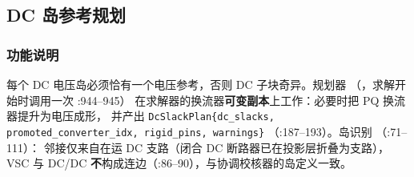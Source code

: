 \subsection{DC 岛参考规划}\label{sec:hybrid-dcref}

\subsubsection*{功能说明}
每个 DC 电压岛必须恰有一个电压参考，否则 DC 子块奇异。规划器
（，求解开始时调用一次 :944--945）
在求解器的换流器\textbf{可变副本}上工作：必要时把 PQ 换流器提升为电压成形，
并产出 \texttt{DcSlackPlan\{dc\_slacks, promoted\_converter\_idx, rigid\_pins, warnings\}}
（:187--193）。岛识别 （:71--111）：
邻接仅来自在运 DC 支路（闭合 DC 断路器已在投影层折叠为支路），
VSC 与 DC/DC \textbf{不}构成连边（:86--90），与协调校核器的岛定义一致。

